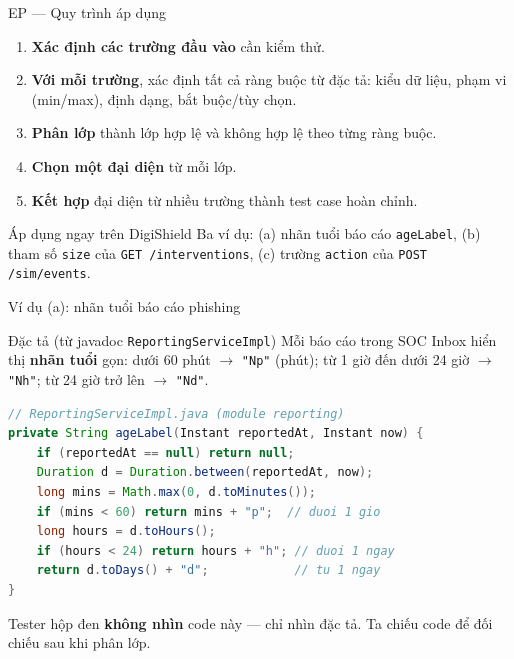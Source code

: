 \documentclass[aspectratio=169,12pt]{beamer}
\begin{document}
\begin{frame}{EP --- Quy trình áp dụng}
  \begin{enumerate}
    \item \textbf{Xác định các trường đầu vào} cần kiểm thử.
    \vspace{0.2em}
    \item \textbf{Với mỗi trường}, xác định tất cả ràng buộc từ đặc tả:
      kiểu dữ liệu, phạm vi (min/max), định dạng, bắt buộc/tùy chọn.
    \vspace{0.2em}
    \item \textbf{Phân lớp} thành lớp hợp lệ và không hợp lệ theo từng ràng buộc.
    \vspace{0.2em}
    \item \textbf{Chọn một đại diện} từ mỗi lớp.
    \vspace{0.2em}
    \item \textbf{Kết hợp} đại diện từ nhiều trường thành test case hoàn chỉnh.
  \end{enumerate}

  \vspace{0.3em}
  \begin{exampleblock}{Áp dụng ngay trên DigiShield}
    Ba ví dụ: (a) nhãn tuổi báo cáo \texttt{ageLabel}, (b) tham số
    \texttt{size} của \texttt{GET /interventions}, (c) trường
    \texttt{action} của \texttt{POST /sim/events}.
  \end{exampleblock}
\end{frame}

\begin{frame}[fragile,shrink=8]{Ví dụ (a): nhãn tuổi báo cáo phishing}
  \begin{block}{Đặc tả (từ javadoc \texttt{ReportingServiceImpl})}
    Mỗi báo cáo trong SOC Inbox hiển thị \textbf{nhãn tuổi} gọn:
    dưới 60 phút $\to$ \texttt{"Np"} (phút); từ 1 giờ đến dưới 24 giờ
    $\to$ \texttt{"Nh"}; từ 24 giờ trở lên $\to$ \texttt{"Nd"}.
  \end{block}

\begin{lstlisting}[language=java]
// ReportingServiceImpl.java (module reporting)
private String ageLabel(Instant reportedAt, Instant now) {
    if (reportedAt == null) return null;
    Duration d = Duration.between(reportedAt, now);
    long mins = Math.max(0, d.toMinutes());
    if (mins < 60) return mins + "p";  // duoi 1 gio
    long hours = d.toHours();
    if (hours < 24) return hours + "h"; // duoi 1 ngay
    return d.toDays() + "d";            // tu 1 ngay
}
\end{lstlisting}

  {\small Tester hộp đen \textbf{không nhìn} code này --- chỉ nhìn đặc tả.
  Ta chiếu code để đối chiếu sau khi phân lớp.}
\end{frame}
\end{document}
